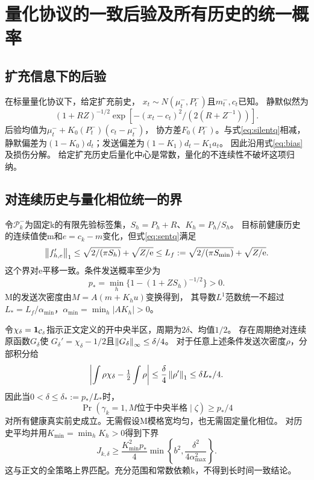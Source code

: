 \section{量化协议的一致后验及所有历史的统一概率}
\label{app:uniform}
\subsection{扩充信息下的后验}
在标量量化协议下，给定扩充前史，
$x_t\sim N(\mu_t^-,P_t^-)$且$m_t^-,c_t$已知。
静默似然为
\[
(1+RZ)^{-1/2}\exp[-(x_t-c_t)^2/(2(R+Z^{-1}))].
\]
后验均值为$\mu_t^-+K_0(P_t^-)(c_t-\mu_t^-)$，
协方差$F_0(P_t^-)$。与式\eqref{eq:silentq}相减，
静默偏差为$(1-K_0)d_t$；发送偏差为$(1-K_1)d_t-K_1a_t$。
因此沿用式\eqref{eq:bias}及损伤分解。
给定扩充历史后量化中心是常数，量化的不连续性不破坏这项归纳。

\subsection{对连续历史与量化相位统一的界}
令$\mathcal P_k^-$为固定k的有限先验标签集，$S_h=P_h+R$、$K_h=P_h/S_h$。
目标前健康历史的连续值使m和$e=c_k-m$变化，但式\eqref{eq:sentq}满足
\[
\left\|f'_{h,e}\right\|_1
\le \sqrt{2/(\pi S_h)}+\sqrt{Z/\mathrm e}
\le L_f:=\sqrt{2/(\pi S_{\min})}+\sqrt{Z/\mathrm e}.
\]
这个界对e平移一致。条件发送概率至少为
\[
p_*=\min_h\{1-(1+ZS_h)^{-1/2}\}>0.
\]
M的发送次密度由$M=A(m+K_hu)$变换得到，
其导数$L^1$范数统一不超过
$L_*=L_f/\alpha_{\min}$，$\alpha_{\min}=\min_h|AK_h|>0$。

令$\chi_\delta=\mathbf 1_{\mathcal C_\delta}$指示正文定义的开中央半区，周期为$2\delta$、均值$1/2$。
存在周期绝对连续原函数$G_\delta$使
$G_\delta'=\chi_\delta-1/2$且$\left\|G_\delta\right\|_\infty\le\delta/4$。
对于任意上述条件发送次密度$\rho$，分部积分给
\[
\left|\int\rho\chi_\delta-\tfrac12\int\rho\right|
\le\frac{\delta}{4}\left\|\rho'\right\|_1\le\delta L_*/4.
\]
因此当$0<\delta\le\delta_*:=p_*/L_*$时，
\[
\Pr(\gamma_k=1,M\text{位于中央半格}\mid\zeta)\ge p_*/4
\]
对所有健康真实前史成立。无需假设M模格宽均匀，也无需固定量化相位。
对历史平均并用$K_{\min}=\min_hK_h>0$得到下界
\[
J_{k,\delta}\ge
\frac{K_{\min}^2p_*}{4}
\min\left\{b^2,\frac{\delta^2}{4\alpha_{\max}^2}\right\}.
\]
这与正文的全策略上界匹配。充分范围和常数依赖k，不得到长时间一致结论。
